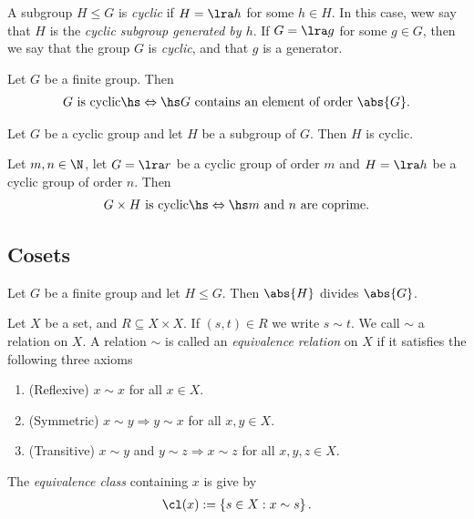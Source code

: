 \documentclass{article}
\begin{document}
\begin{definition}
    A subgroup $H\leq G$ is \emph{cyclic} if $H=\lra h$ for some
    $h\in H$. In this case, wew say that $H$ is the \emph{cyclic subgroup
    generated by $h$}. If $G=\lra g$ for some $g\in G$, then we
    say that the group $G$ is \emph{cyclic}, and that $g$ is a generator.
\end{definition}

\setcounter{theorem}{13}
\begin{lemma}
    Let $G$ be a finite group. Then
    \begin{align*}
        \text{$G$ is cyclic} \hs\Leftrightarrow\hs \text{$G$ contains an element of order $\abs{G}$}.
    \end{align*}
\end{lemma}

\begin{theorem}
    Let $G$ be a cyclic group and let $H$ be a subgroup of $G$. Then
    $H$ is cyclic.
\end{theorem}

\begin{theorem}
    Let $m,n\in\N$, let $G=\lra r$ be a cyclic group of order $m$
    and $H=\lra h$ be a cyclic group of order $n$. Then
    \begin{align*}
        \text{$G\times H$ is cyclic} \hs\Leftrightarrow\hs \text{$m$ and $n$ are coprime.}
    \end{align*}
\end{theorem}

\subsection{Cosets}

\begin{theorem}
    Let $G$ be a finite group and let $H\leq G$.
    Then $\abs{H}$ divides $\abs{G}$. 
\end{theorem}

\begin{definition}
    Let $X$ be a set, and $R\subseteq X\times X$.
    If $(s,t)\in R$ we write $s\sim t$. We call $\sim$
    a relation on $X$. A relation $\sim$ is called an
    \emph{equivalence relation} on $X$ if it satisfies
    the following three axioms
    \begin{enumerate}[label=E\arabic*.]
        \item (Reflexive) $x\sim x$ for all $x\in X$.
        \item (Symmetric) $x\sim y \Rightarrow y\sim x$ for all $x,y\in X$.
        \item (Transitive) $x\sim y$ and $y\sim z \Rightarrow x\sim z$ for all $x,y,z\in X$.
    \end{enumerate}
    The \emph{equivalence class} containing $x$ is give by
    \begin{align*}
        \cl(x) := \left\{s\in X : x\sim s\right\}.
    \end{align*}
\end{definition}
\end{document}
